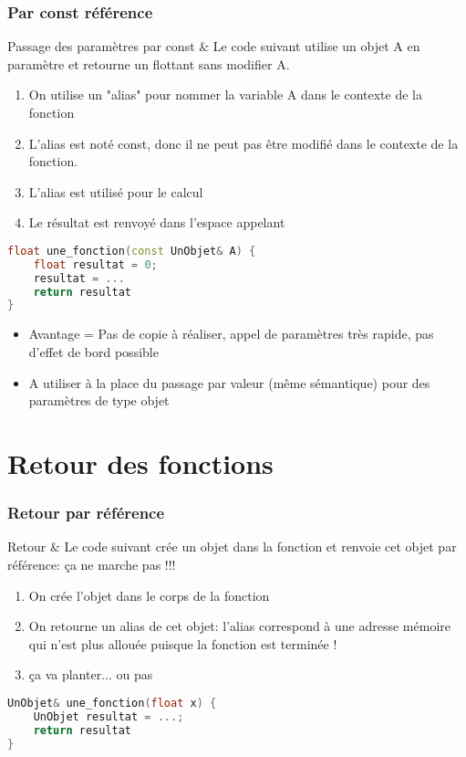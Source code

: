 \documentclass{beamer}
\begin{document}
\begin{frame}[fragile=singleslide,shrink=20]
\frametitle {Par const référence}

\begin{block}{Passage des paramètres par const \&}
Le code suivant utilise un objet A en paramètre et retourne un flottant sans modifier A.
\begin{enumerate}
\item On utilise un "alias" pour nommer la variable A dans le contexte de la fonction
\item L'alias est noté const, donc il ne peut pas être modifié dans le contexte de la fonction.
\item L'alias est utilisé pour le calcul
\item Le résultat est renvoyé dans l'espace appelant
\end{enumerate}
\end{block}

\begin{lstlisting}[language=c++]
float une_fonction(const UnObjet& A) {
    float resultat = 0;
    resultat = ...
    return resultat
}
\end{lstlisting}

\begin{block}{}
\begin{itemize}
\item Avantage = Pas de copie à réaliser, appel de paramètres très rapide, pas d'effet de bord possible
\item A utiliser à la place du passage par valeur (même sémantique) pour des paramètres de type objet
\end{itemize}
\end{block}
\end{frame}

\section{Retour des fonctions}

\begin{frame}[fragile=singleslide,shrink=20]
\frametitle {Retour par référence}

\begin{block}{Retour \&}
Le code suivant crée un objet dans la fonction et renvoie cet objet par référence: ça ne marche pas !!!

\begin{enumerate}
\item On crée l'objet dans le corps de la fonction
\item On retourne un alias de cet objet: l'alias correspond à une adresse mémoire qui n'est plus allouée puisque la fonction est terminée !
\item ça va planter... ou pas
\end{enumerate}
\end{block}

\begin{lstlisting}[language=c++]
UnObjet& une_fonction(float x) {
    UnObjet resultat = ...;
    return resultat
}
\end{lstlisting}
\end{frame}
\end{document}
